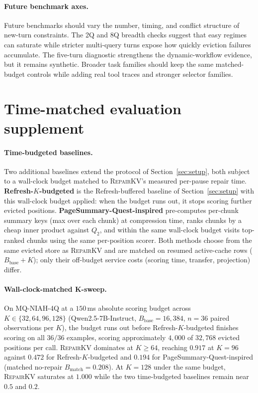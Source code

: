 \documentclass{article}
\newcommand{\repairkv}{\textsc{RepairKV}}
\newcommand{\bbase}{\ensuremath{B_{\mathrm{base}}}}
\newcommand{\bmatch}{\ensuremath{B_{\mathrm{match}}}}
\begin{document}
\paragraph{Future benchmark axes.}
Future benchmarks should vary the number, timing, and conflict structure
of new-turn constraints.
The 2Q and 8Q breadth checks suggest that easy regimes can saturate while
stricter multi-query turns expose how quickly eviction failures
accumulate.
The five-turn diagnostic strengthens the dynamic-workflow evidence, but
it remains synthetic.
Broader task families should keep the same
matched-budget controls while adding real tool traces and stronger
selector families.

\begingroup\color{green!50!black}
\section{Time-matched evaluation supplement}
\label{app:p18-supplement}

\paragraph{Time-budgeted baselines.} Two additional baselines extend the protocol of Section~\ref{sec:setup}, both subject to a wall-clock budget matched to \repairkv{}'s measured per-pause repair time. \textbf{Refresh-$K$-budgeted} is the Refresh-buffered baseline of Section~\ref{sec:setup} with this wall-clock budget applied: when the budget runs out, it stops scoring further evicted positions. \textbf{PageSummary-Quest-inspired} pre-computes per-chunk summary keys (max over each chunk) at compression time, ranks chunks by a cheap inner product against $Q_2$, and within the same wall-clock budget visits top-ranked chunks using the same per-position scorer. Both methods choose from the same evicted store as \repairkv{} and are matched on resumed active-cache rows ($\bbase{+}K$); only their off-budget service costs (scoring time, transfer, projection) differ.

\paragraph{Wall-clock-matched K-sweep.} On MQ-NIAH-4Q at a $150$\,ms absolute scoring budget across $K\in\{32,64,96,128\}$ (Qwen2.5-7B-Instruct, $\bbase{=}16{,}384$, $n{=}36$ paired observations per $K$), the budget runs out before Refresh-$K$-budgeted finishes scoring on all $36/36$ examples, scoring approximately $4{,}000$ of $32{,}768$ evicted positions per call. \repairkv{} dominates at $K\geq 64$, reaching $0.917$ at $K{=}96$ against $0.472$ for Refresh-$K$-budgeted and $0.194$ for PageSummary-Quest-inspired (matched no-repair $\bmatch{=}0.208$). At $K{=}128$ under the same budget, \repairkv{} saturates at $1.000$ while the two time-budgeted baselines remain near $0.5$ and $0.2$.
\end{document}
